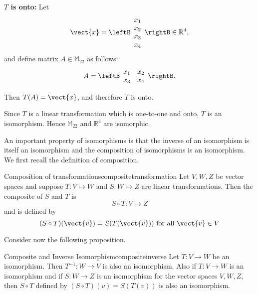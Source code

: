 \begin{solution}
\textbf{$T$ is onto:}
Let
\[ \vect{x}=\leftB\begin{array}{c} x_1\\x_2\\x_3\\x_4 \end{array}\rightB\in\mathbb{R}^4,\]
and
define matrix $A\in\mathbb{M}_{22}$ as follows:
\[ A=\leftB\begin{array}{cc} x_1 & x_2 \\ x_3 & x_4 \end{array}\rightB.\]

Then $T(A)=\vect{x}$, and therefore $T$ is onto.

Since $T$ is a linear transformation which is one-to-one and onto, $T$ is an isomorphism. Hence $\mathbb{M}_{22}$ and $\mathbb{R}^4$ are isomorphic.
\end{solution}

An important property of isomorphisms is that the inverse of an isomorphism
is itself an isomorphism and the composition of isomorphisms is an
isomorphism. We first recall the definition of composition.

\begin{definition}{Composition of transformations}{compositetransformation}
Let $V, W, Z$ be vector spaces and suppose $T: V \mapsto W$ and $S: W \mapsto Z$ are linear transformations. Then the composite of $S$ and $T$ is
\[
S \circ T: V \mapsto Z
\]
and is defined by 
\[
(S \circ T) (\vect{v}) = S(T(\vect{v})) \mbox{ for all } \vect{v} \in V
\]
\end{definition}

Consider now the following proposition.

\begin{proposition}{Composite and Inverse Isomorphism}{compositeinverse}
Let $T:V\rightarrow W$ be an isomorphism. Then $T^{-1}:W\rightarrow V$ is
also an isomorphism. Also if $T:V\rightarrow W$ is an isomorphism and if $
S:W\rightarrow Z$ is an isomorphism for the vector spaces $V,W,Z,$ then $
S\circ T$ defined by $\left( S\circ T\right) \left( v\right) = S\left(
T\left( v\right) \right) $ is also an isomorphism.
\end{proposition}

